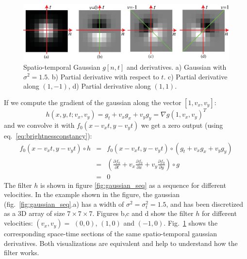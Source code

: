\begin{figure}
\includegraphics[width=1\linewidth]{figures/temporal_filters/gaussians_xyt_section.eps}
\caption{Spatio-temporal Gaussian $g\left[ n,t \right]$ and derivatives. a) Gaussian with $\sigma^2=1.5$. b) Partial derivative with respect to $t$. c) Partial derivative along $(1,-1)$, d) Partial derivative along $(1,1)$.} 
\label{fig:gaussian_xyt_section}
\end{figure}

If we compute the gradient of the gaussian along the vector $\left[1,v_x,v_y\right]$:
\begin{equation}
h(x,y,t;v_x,v_y) = g_t+v_xg_x+v_yg_y = \nabla  g \left( 1,v_x,v_y \right)^T
\end{equation}
and we convolve it with $f_0 (x-v_xt,y-v_yt)$ we get a zero output (using eq.~\ref{eq:brightnessconstancy}):
\begin{eqnarray}
f_0 (x-v_xt,y-v_yt) \circ h &=& f_0 (x-v_xt,y-v_yt) \circ \left(  g_t+v_xg_x+v_yg_y \right) \\
&=& \left( \frac{\partial f_0}{\partial t} + v_x \frac{\partial f_0}{\partial x} + v_y \frac{\partial f_0}{\partial y} \right) \circ g \\
&=& 0
\end{eqnarray}
The filter $h$ is shown in figure \ref{fig:gaussian_seq} as a sequence for different velocities. In the example shown in the figure, the gaussian (fig.~\ref{fig:gaussian_seq}.a) has a width of $\sigma^2=\sigma_t^2=1.5$, and has been discretized as a 3D array of size $7 \times 7 \times 7$. Figures b,c and d  show the filter $h$ for different velocities: $(v_x,v_y) =$ $(0,0)$, $(1,0)$ and $(-1,0)$. Fig.~\ref{fig:gaussian_xyt_section} shows the corresponding space-time sections of the same spatio-temporal gaussian derivatives. Both visualizations are equivalent and help to understand how the filter works.
%



